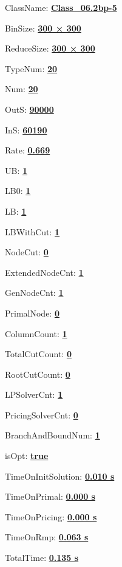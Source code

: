 \documentclass[11pt]{article}
\begin{document}
\pagestyle{empty}


ClassName: \underline{\textbf{Class_06.2bp-5}}
\par
BinSize: \underline{\textbf{300 × 300}}
\par
ReduceSize: \underline{\textbf{300 × 300}}
\par
TypeNum: \underline{\textbf{20}}
\par
Num: \underline{\textbf{20}}
\par
OutS: \underline{\textbf{90000}}
\par
InS: \underline{\textbf{60190}}
\par
Rate: \underline{\textbf{0.669}}
\par
UB: \underline{\textbf{1}}
\par
LB0: \underline{\textbf{1}}
\par
LB: \underline{\textbf{1}}
\par
LBWithCut: \underline{\textbf{1}}
\par
NodeCut: \underline{\textbf{0}}
\par
ExtendedNodeCnt: \underline{\textbf{1}}
\par
GenNodeCnt: \underline{\textbf{1}}
\par
PrimalNode: \underline{\textbf{0}}
\par
ColumnCount: \underline{\textbf{1}}
\par
TotalCutCount: \underline{\textbf{0}}
\par
RootCutCount: \underline{\textbf{0}}
\par
LPSolverCnt: \underline{\textbf{1}}
\par
PricingSolverCnt: \underline{\textbf{0}}
\par
BranchAndBoundNum: \underline{\textbf{1}}
\par
isOpt: \underline{\textbf{true}}
\par
TimeOnInitSolution: \underline{\textbf{0.010 s}}
\par
TimeOnPrimal: \underline{\textbf{0.000 s}}
\par
TimeOnPricing: \underline{\textbf{0.000 s}}
\par
TimeOnRmp: \underline{\textbf{0.063 s}}
\par
TotalTime: \underline{\textbf{0.135 s}}
\par
\newpage
\end{document}
